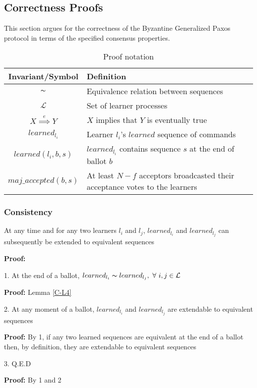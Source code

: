 \subsection{Correctness Proofs}

This section argues for the correctness of the Byzantine Generalized Paxos protocol in terms of the specified consensus properties.\par


\begin{table}[h!]
	\renewcommand{\arraystretch}{1.5}
	\centering
	\begin{tabularx}{\linewidth}{ |c|X|}
		\hline
		Invariant/Symbol & Definition \\
		\hline
		$\thicksim$ & Equivalence relation between sequences \\
		\hline
		$\mathcal{L}$ & Set of learner processes \\
		\hline
		$X \overset{e}{\implies} Y$ & $X$ implies that $Y$ is eventually true \\
		\hline
		$learned_{l_i}$ & Learner $l_i$'s $learned$ sequence of commands \\
		\hline
		$learned(l_i,b,s)$ & $learned_{l_i}$ contains sequence $s$ at the end of ballot $b$  \\
		\hline
		$maj\_accepted(b,s)$ & At least $N-f$ acceptors broadcasted their acceptance votes to the learners\\
		\hline
	\end{tabularx} 
	\caption{Proof notation} 
	\label{table:1}
\end{table}

\subsubsection{Consistency}
\begin{theorem}
At any time and for any two learners $l_i$ and $l_j$, $learned_{l_i}$ and $learned_{l_j}$ can subsequently be extended to equivalent sequences \label{C-T1}
\end{theorem} 
\textbf{Proof:} \par
1. At the end of a ballot, $learned_{l_i} \thicksim learned_{l_j},\ \forall\ i,j \in \mathcal{L}$\par
\indent\indent\textbf{Proof:} Lemma \ref{C-L4} \par
2. At any moment of a ballot, $learned_{l_i}$ and $learned_{l_j}$ are extendable to equivalent sequences \par
\indent\indent\textbf{Proof:} By 1, if any two learned sequences are equivalent at the end of a ballot then, by definition, they are extendable to equivalent sequences\par
3. Q.E.D \par
\indent\indent\textbf{Proof:} By 1 and 2\par

